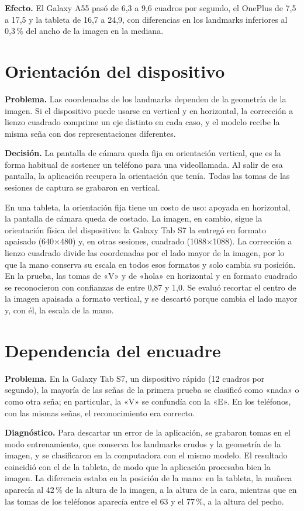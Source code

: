 \textbf{Efecto.} El Galaxy A55 pasó de 6,3 a 9,6 cuadros por segundo, el OnePlus de 7,5 a 17,5 y la tableta de 16,7 a 24,9, con diferencias en los landmarks inferiores al 0,3\,\% del ancho de la imagen en la mediana.

\section{Orientación del dispositivo}

\textbf{Problema.} Las coordenadas de los landmarks dependen de la geometría de la imagen. Si el dispositivo puede usarse en vertical y en horizontal, la corrección a lienzo cuadrado comprime un eje distinto en cada caso, y el modelo recibe la misma seña con dos representaciones diferentes.

\textbf{Decisión.} La pantalla de cámara queda fija en orientación vertical, que es la forma habitual de sostener un teléfono para una videollamada. Al salir de esa pantalla, la aplicación recupera la orientación que tenía. Todas las tomas de las sesiones de captura se grabaron en vertical.

En una tableta, la orientación fija tiene un costo de uso: apoyada en horizontal, la pantalla de cámara queda de costado. La imagen, en cambio, sigue la orientación física del dispositivo: la Galaxy Tab S7 la entregó en formato apaisado (640$\times$480) y, en otras sesiones, cuadrado (1088$\times$1088). La corrección a lienzo cuadrado divide las coordenadas por el lado mayor de la imagen, por lo que la mano conserva su escala en todos esos formatos y solo cambia su posición. En la prueba, las tomas de «V» y de «hola» en horizontal y en formato cuadrado se reconocieron con confianzas de entre 0,87 y 1,0. Se evaluó recortar el centro de la imagen apaisada a formato vertical, y se descartó porque cambia el lado mayor y, con él, la escala de la mano.

\section{Dependencia del encuadre}
\label{sec:encuadre}

\textbf{Problema.} En la Galaxy Tab S7, un dispositivo rápido (12 cuadros por segundo), la mayoría de las señas de la primera prueba se clasificó como «nada» o como otra seña; en particular, la «V» se confundía con la «E». En los teléfonos, con las mismas señas, el reconocimiento era correcto.

\textbf{Diagnóstico.} Para descartar un error de la aplicación, se grabaron tomas en el modo entrenamiento, que conserva los landmarks crudos y la geometría de la imagen, y se clasificaron en la computadora con el mismo modelo. El resultado coincidió con el de la tableta, de modo que la aplicación procesaba bien la imagen. La diferencia estaba en la posición de la mano: en la tableta, la muñeca aparecía al 42\,\% de la altura de la imagen, a la altura de la cara, mientras que en las tomas de los teléfonos aparecía entre el 63 y el 77\,\%, a la altura del pecho.

